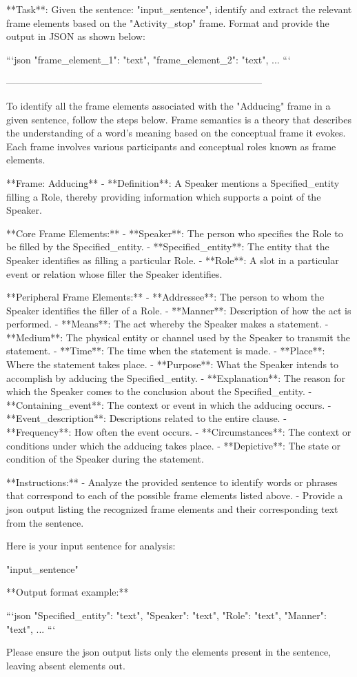 **Task**: Given the sentence: "{input_sentence}", identify and extract the relevant frame elements based on the "Activity_stop" frame. Format and provide the output in JSON as shown below:

```json
{
    "frame_element_1": "text",
    "frame_element_2": "text",
    ...
}
```


--------------------------------------------------------------------------------



To identify all the frame elements associated with the "Adducing" frame in a given sentence, follow the steps below. Frame semantics is a theory that describes the understanding of a word's meaning based on the conceptual frame it evokes. Each frame involves various participants and conceptual roles known as frame elements.

**Frame: Adducing**
- **Definition**: A Speaker mentions a Specified_entity filling a Role, thereby providing information which supports a point of the Speaker.

**Core Frame Elements:**
- **Speaker**: The person who specifies the Role to be filled by the Specified_entity.
- **Specified_entity**: The entity that the Speaker identifies as filling a particular Role.
- **Role**: A slot in a particular event or relation whose filler the Speaker identifies.

**Peripheral Frame Elements:**
- **Addressee**: The person to whom the Speaker identifies the filler of a Role.
- **Manner**: Description of how the act is performed.
- **Means**: The act whereby the Speaker makes a statement.
- **Medium**: The physical entity or channel used by the Speaker to transmit the statement.
- **Time**: The time when the statement is made.
- **Place**: Where the statement takes place.
- **Purpose**: What the Speaker intends to accomplish by adducing the Specified_entity.
- **Explanation**: The reason for which the Speaker comes to the conclusion about the Specified_entity.
- **Containing_event**: The context or event in which the adducing occurs.
- **Event_description**: Descriptions related to the entire clause.
- **Frequency**: How often the event occurs.
- **Circumstances**: The context or conditions under which the adducing takes place.
- **Depictive**: The state or condition of the Speaker during the statement.

**Instructions:**
- Analyze the provided sentence to identify words or phrases that correspond to each of the possible frame elements listed above.
- Provide a json output listing the recognized frame elements and their corresponding text from the sentence.

Here is your input sentence for analysis:

"{input_sentence}"

**Output format example:**

```json
{
    "Specified_entity": "text",
    "Speaker": "text",
    "Role": "text",
    "Manner": "text",
    ...
}
```

Please ensure the json output lists only the elements present in the sentence, leaving absent elements out.